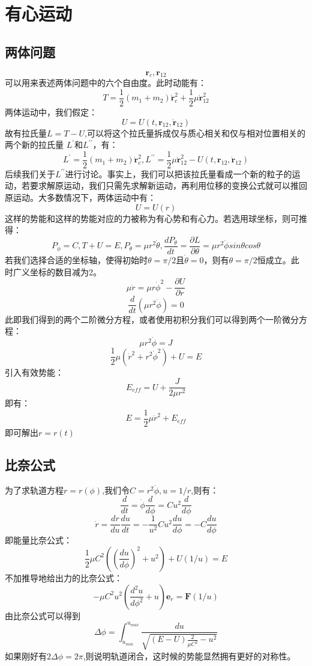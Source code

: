 \documentclass[a4paper, 10pt, openany]{book}%
\begin{document}
    \section{有心运动}
    \subsection{两体问题}
    $$\textbf{r}_c,\textbf{r}_{12}$$
    可以用来表述两体问题中的六个自由度。此时动能有：
    $$T=\frac{1}{2}(m_1+m_2)\dot{\textbf{r}}^2_c+\frac{1}{2}\mu \dot{\textbf{r}}^2_{12}$$
    两体运动中，我们假定：
    $$U=U(t,\textbf{r}_{12},\dot{\textbf{r}}_{12})$$
    故有拉氏量$L=T-U$,可以将这个拉氏量拆成仅与质心相关和仅与相对位置相关的两个新的拉氏量 $L^\prime$和$L^{\prime\prime}$，有：
    $$L^\prime=\frac{1}{2}(m_1+m_2)\dot{\textbf{r}}^2_c,L^{\prime\prime}=\frac{1}{2}\mu \dot{\textbf{r}}^2_{12}-U(t,\textbf{r}_{12},\dot{\textbf{r}}_{12})$$
    后续我们关于$L^{\prime\prime}$进行讨论。事实上，我们可以把该拉氏量看成一个新的粒子的运动，若要求解原运动，我们只需先求解新运动，再利用位移的变换公式就可以推回原运动。大多数情况下，两体运动中有：
    $$U=U(r)$$
    这样的势能和这样的势能对应的力被称为有心势和有心力。若选用球坐标，则可推得：
    $$P_\phi=C,T+U=E,P_\theta=\mu {r}^2\dot{\theta},\frac{dP_\theta}{dt}=\frac{\partial L}{\partial {\theta}}=\mu {r}^2\dot{\phi}sin\theta cos\theta$$
    若我们选择合适的坐标轴，使得初始时$\theta=\pi/2$且$\dot{\theta}=0$，则有$\theta=\pi/2$恒成立。此时广义坐标的数目减为2。
    $$\mu\ddot{r}=\mu r\dot{\phi}^2-\frac{\partial U}{\partial r}$$
    $$\frac{d}{dt}(\mu r^2\dot{\phi})=0$$
    此即我们得到的两个二阶微分方程，或者使用初积分我们可以得到两个一阶微分方程：
    $$\mu r^2\dot{\phi}=J$$
    $$\frac{1}{2}\mu (\dot{r}^2+r^2\dot{\phi}^2)+U=E$$
    引入有效势能：
    $$E_{eff}=U+\frac{J}{2\mu r^2}$$
    即有：
    $$E=\frac{1}{2}\mu \dot{r}^2+E_{eff}$$
    即可解出$r=r(t)$
    \subsection{比奈公式}
    为了求轨道方程$r=r(\phi)$,我们令$C=r^2\dot{\phi},u=1/r$,则有：
    $$\frac{d}{dt}=\dot{\phi}\frac{d}{d\phi}=Cu^2\frac{d}{d\phi}$$
    $$\dot{r}=\frac{dr}{du}\frac{du}{dt}=-\frac{1}{u^2}Cu^2\frac{du}{d\phi}=-C\frac{du}{d\phi}$$
    即能量比奈公式：
    $$\frac{1}{2}\mu C^2((\frac{du}{d\phi})^2+u^2)+U(1/u)=E$$
    不加推导地给出力的比奈公式：
    $$-\mu C^2u^2(\frac{d^2u}{d\phi^2}+u)\textbf{e}_r=\textbf{F}(1/u)$$
    由比奈公式可以得到
    $$\Delta \phi=\int_{u_{min}}^{u_{max}}\frac{du}{\sqrt{(E-U)\frac{2}{\mu C^2}-u^2}}$$
    如果刚好有$2\Delta \phi=2\pi$,则说明轨道闭合，这时候的势能显然拥有更好的对称性。
\end{document}
